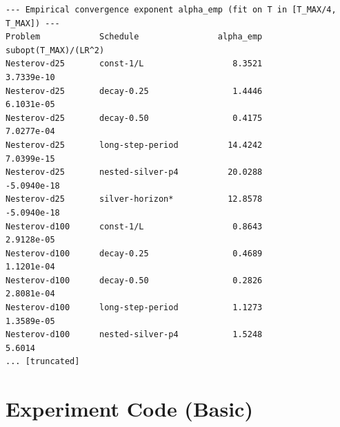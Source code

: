 \documentclass[11pt]{article}
\begin{document}
\begin{lstlisting}
--- Empirical convergence exponent alpha_emp (fit on T in [T_MAX/4, T_MAX]) ---
Problem            Schedule                alpha_emp   subopt(T_MAX)/(LR^2)
Nesterov-d25       const-1/L                  8.3521             3.7339e-10
Nesterov-d25       decay-0.25                 1.4446             6.1031e-05
Nesterov-d25       decay-0.50                 0.4175             7.0277e-04
Nesterov-d25       long-step-period          14.4242             7.0399e-15
Nesterov-d25       nested-silver-p4          20.0288            -5.0940e-18
Nesterov-d25       silver-horizon*           12.8578            -5.0940e-18
Nesterov-d100      const-1/L                  0.8643             2.9128e-05
Nesterov-d100      decay-0.25                 0.4689             1.1201e-04
Nesterov-d100      decay-0.50                 0.2826             2.8081e-04
Nesterov-d100      long-step-period           1.1273             1.3589e-05
Nesterov-d100      nested-silver-p4           1.5248             5.6014
... [truncated]
\end{lstlisting}


\section{Experiment Code (Basic)}
\end{document}
